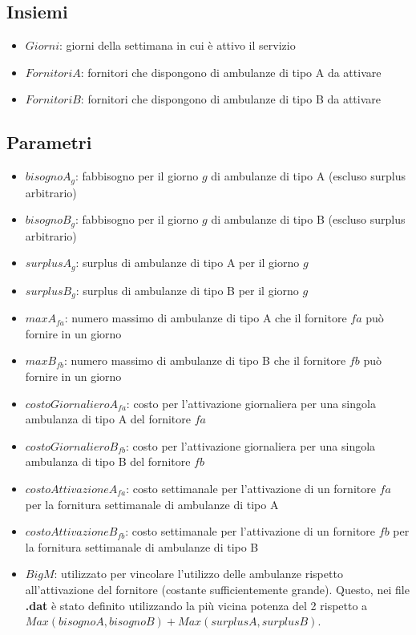 \subsection{Insiemi}
\begin{itemize}
    \item $Giorni$: giorni della settimana in cui è attivo il servizio
    \item $FornitoriA$: fornitori che dispongono di ambulanze di tipo A da attivare
    \item $FornitoriB$: fornitori che dispongono di ambulanze di tipo B da attivare
\end{itemize}
\subsection{Parametri}
\begin{itemize}
    \item $bisognoA_{g}$: fabbisogno per il giorno $g$ di ambulanze di tipo A (escluso surplus arbitrario)
    \item $bisognoB_{g}$: fabbisogno per il giorno $g$ di ambulanze di tipo B (escluso surplus arbitrario)
    \item $surplusA_{g}$: surplus di ambulanze di tipo A per il giorno $g$
    \item $surplusB_{g}$: surplus di ambulanze di tipo B per il giorno $g$
    \item $maxA_{fa}$: numero massimo di ambulanze di tipo A che il fornitore $fa$ può fornire in un giorno
    \item $maxB_{fb}$: numero massimo di ambulanze di tipo B che il fornitore $fb$ può fornire in un giorno
    \item $costoGiornalieroA_{fa}$: costo per l'attivazione giornaliera per una singola ambulanza di tipo A del fornitore $fa$
    \item $costoGiornalieroB_{fb}$: costo per l'attivazione giornaliera per una singola ambulanza di tipo B del fornitore $fb$
    \item $costoAttivazioneA_{fa}$: costo settimanale per l'attivazione di un fornitore $fa$ per la fornitura settimanale di ambulanze di tipo A
    \item $costoAttivazioneB_{fb}$: costo settimanale per l'attivazione di un fornitore $fb$ per la fornitura settimanale di ambulanze di tipo B
    \item $BigM$: utilizzato per vincolare l'utilizzo delle ambulanze rispetto all'attivazione del fornitore (costante sufficientemente grande). Questo, nei file \textbf{.dat} è stato definito utilizzando la più vicina potenza del 2 rispetto a $Max(bisognoA, bisognoB) + Max(surplusA, surplusB)$.
\end{itemize}
